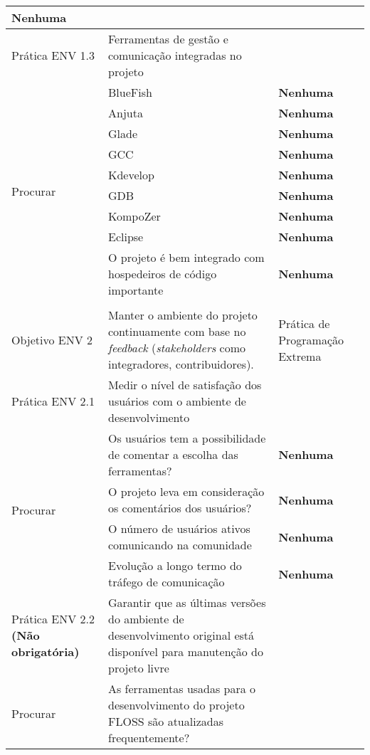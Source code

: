 \begin{longtable}{|p{2cm}|p{7cm}|p{7cm}|}
  \textbf{Nenhuma} \\
  \hline \cellcolor[gray]{0.9} Prática ENV 1.3 & \cellcolor[gray]{0.9}
  Ferramentas de gestão e comunicação integradas no projeto & \\
  \hline \multirow{9}{*}{Procurar} & BlueFish  & \textbf{Nenhuma} \\
  \cline{2-3} & Anjuta & \textbf{Nenhuma} \\
  \cline{2-3} & Glade & \textbf{Nenhuma} \\
  \cline{2-3} & GCC & \textbf{Nenhuma} \\
  \cline{2-3} & Kdevelop & \textbf{Nenhuma} \\
  \cline{2-3} & GDB & \textbf{Nenhuma} \\
  \cline{2-3} & KompoZer & \textbf{Nenhuma} \\
  \cline{2-3} & Eclipse & \textbf{Nenhuma} \\
  \cline{2-3} & O projeto é bem integrado com hospedeiros de
  código importante & \textbf{Nenhuma} \\
  \hline
  & & \\
  \hline \cellcolor[gray]{0.6} Objetivo ENV 2 & \cellcolor[gray]{0.6}
  Manter o ambiente do projeto continuamente com base no
  \textit{feedback} (\textit{stakeholders} como integradores,
  contribuidores). & Prática de Programação Extrema \\
  \hline \cellcolor[gray]{0.9} Prática ENV 2.1 & \cellcolor[gray]{0.9}
  Medir o nível de satisfação dos usuários com o ambiente de
  desenvolvimento & \\
  \hline \multirow{4}{*}{Procurar} & Os usuários tem a possibilidade
  de comentar a escolha das ferramentas?  & \textbf{Nenhuma} \\
  \cline{2-3} & O projeto leva em consideração os comentários dos
  usuários? & \textbf{Nenhuma} \\
  \cline{2-3} & O número de usuários ativos comunicando na comunidade
  & \textbf{Nenhuma} \\
  \cline{2-3} & Evolução a longo termo do tráfego de comunicação &
  \textbf{Nenhuma} \\
  \hline \cellcolor[gray]{0.9} Prática ENV 2.2 \textbf{(Não
    obrigatória)} & \cellcolor[gray]{0.9} Garantir que as últimas
  versões do ambiente de desenvolvimento
  original está disponível para manutenção do projeto livre & \\
  \hline \multirow{1}{*}{Procurar} & As ferramentas usadas para o
  desenvolvimento do projeto FLOSS são atualizadas frequentemente?  &

\end{longtable}
